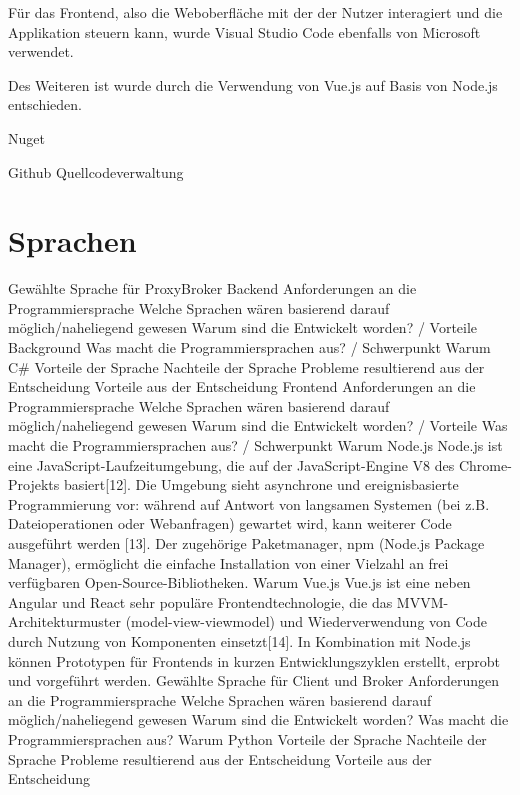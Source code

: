     Für das Frontend, also die Weboberfläche mit der der Nutzer interagiert und die Applikation steuern kann, wurde Visual Studio Code \cite{sole_2019} ebenfalls von Microsoft verwendet.
    
    Des Weiteren ist wurde durch die Verwendung von Vue.js \cite{you2018vue} auf Basis von Node.js \cite{tilkov2010node} entschieden.

    Nuget \cite{balliauw2012pro} %
    
    Github Quellcodeverwaltung %

\section{Sprachen}
    Gewählte Sprache für ProxyBroker
    Backend
        Anforderungen an die Programmiersprache
        Welche Sprachen wären basierend darauf möglich/naheliegend gewesen
            Warum sind die Entwickelt worden? / Vorteile Background
            Was macht die Programmiersprachen aus? / Schwerpunkt
        Warum C\#
            Vorteile der Sprache
            Nachteile der Sprache 
            Probleme resultierend aus der Entscheidung
            Vorteile aus der Entscheidung
    Frontend
        Anforderungen an die Programmiersprache
        Welche Sprachen wären basierend darauf möglich/naheliegend gewesen
            Warum sind die Entwickelt worden? / Vorteile
            Was macht die Programmiersprachen aus? / Schwerpunkt
        Warum Node.js
            Node.js ist eine JavaScript-Laufzeitumgebung, die auf der JavaScript-Engine V8 des Chrome-Projekts basiert[12]. Die Umgebung sieht asynchrone und ereignisbasierte Programmierung vor: während auf Antwort von langsamen Systemen (bei z.B. Dateioperationen oder Webanfragen) gewartet wird, kann weiterer Code ausgeführt werden [13]. Der zugehörige Paketmanager, npm (Node.js Package Manager), ermöglicht die einfache Installation von einer Vielzahl an frei verfügbaren Open-Source-Bibliotheken. 
        Warum Vue.js
            Vue.js ist eine neben Angular und React sehr populäre Frontendtechnologie, die das MVVM-Architekturmuster (model-view-viewmodel) und Wiederverwendung von Code durch Nutzung von Komponenten einsetzt[14]. In Kombination mit Node.js können Prototypen für Frontends in kurzen Entwicklungszyklen erstellt, erprobt und vorgeführt werden.
    Gewählte Sprache für Client und Broker
        Anforderungen an die Programmiersprache
        Welche Sprachen wären basierend darauf möglich/naheliegend gewesen
            Warum sind die Entwickelt worden? 
            Was macht die Programmiersprachen aus?
        Warum Python
            Vorteile der Sprache
            Nachteile der Sprache 
            Probleme resultierend aus der Entscheidung
            Vorteile aus der Entscheidung
     
